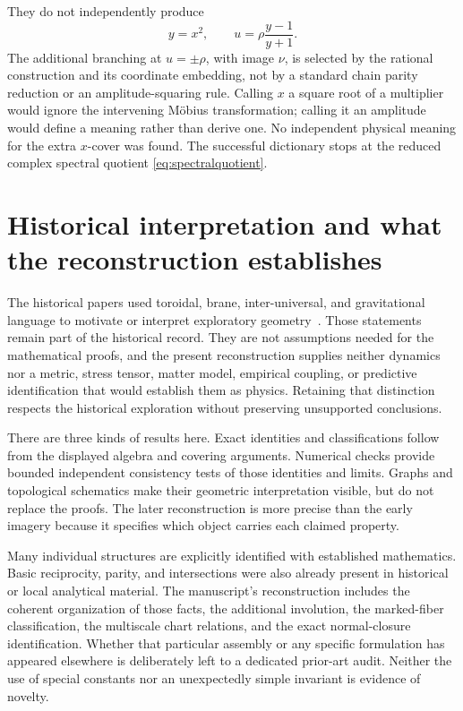 They do not independently produce
\[
y=x^2,\qquad u=\rho\frac{y-1}{y+1}.
\]
The additional branching at \(u=\pm\rho\), with image \(\nu\), is selected by the rational construction and its coordinate embedding, not by a standard chain parity reduction or an amplitude-squaring rule. Calling \(x\) a square root of a multiplier would ignore the intervening Möbius transformation; calling it an amplitude would define a meaning rather than derive one. No independent physical meaning for the extra \(x\)-cover was found. The successful dictionary stops at the reduced complex spectral quotient \eqref{eq:spectralquotient}.

\section{Historical interpretation and what the reconstruction establishes}\label{sec:lessons}

The historical papers used toroidal, brane, inter-universal, and gravitational language to motivate or interpret exploratory geometry~\cite{H1,H2,H4}. Those statements remain part of the historical record. They are not assumptions needed for the mathematical proofs, and the present reconstruction supplies neither dynamics nor a metric, stress tensor, matter model, empirical coupling, or predictive identification that would establish them as physics. Retaining that distinction respects the historical exploration without preserving unsupported conclusions.

There are three kinds of results here. Exact identities and classifications follow from the displayed algebra and covering arguments. Numerical checks provide bounded independent consistency tests of those identities and limits. Graphs and topological schematics make their geometric interpretation visible, but do not replace the proofs. The later reconstruction is more precise than the early imagery because it specifies which object carries each claimed property.

Many individual structures are explicitly identified with established mathematics. Basic reciprocity, parity, and intersections were also already present in historical or local analytical material. The manuscript's reconstruction includes the coherent organization of those facts, the additional involution, the marked-fiber classification, the multiscale chart relations, and the exact normal-closure identification. Whether that particular assembly or any specific formulation has appeared elsewhere is deliberately left to a dedicated prior-art audit. Neither the use of special constants nor an unexpectedly simple invariant is evidence of novelty.

